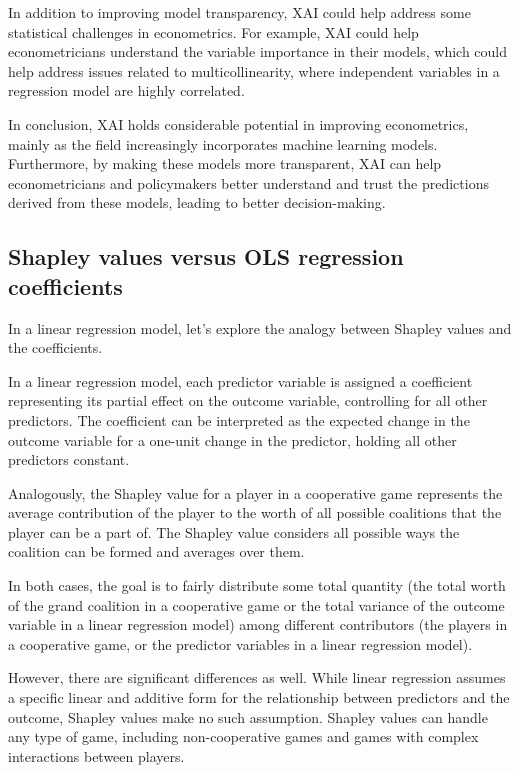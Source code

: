 \documentclass[
  letterpaper,
  DIV=11,
  numbers=noendperiod]{scrartcl}
\begin{document}
In addition to improving model transparency, XAI could help address some
statistical challenges in econometrics. For example, XAI could help
econometricians understand the variable importance in their models,
which could help address issues related to multicollinearity, where
independent variables in a regression model are highly correlated.

In conclusion, XAI holds considerable potential in improving
econometrics, mainly as the field increasingly incorporates machine
learning models. Furthermore, by making these models more transparent,
XAI can help econometricians and policymakers better understand and
trust the predictions derived from these models, leading to better
decision-making.

\hypertarget{shapley-values-versus-ols-regression-coefficients}{%
\subsection{Shapley values versus OLS regression
coefficients}\label{shapley-values-versus-ols-regression-coefficients}}

In a linear regression model, let's explore the analogy between Shapley
values and the coefficients.

In a linear regression model, each predictor variable is assigned a
coefficient representing its partial effect on the outcome variable,
controlling for all other predictors. The coefficient can be interpreted
as the expected change in the outcome variable for a one-unit change in
the predictor, holding all other predictors constant.

Analogously, the Shapley value for a player in a cooperative game
represents the average contribution of the player to the worth of all
possible coalitions that the player can be a part of. The Shapley value
considers all possible ways the coalition can be formed and averages
over them.

In both cases, the goal is to fairly distribute some total quantity (the
total worth of the grand coalition in a cooperative game or the total
variance of the outcome variable in a linear regression model) among
different contributors (the players in a cooperative game, or the
predictor variables in a linear regression model).

However, there are significant differences as well. While linear
regression assumes a specific linear and additive form for the
relationship between predictors and the outcome, Shapley values make no
such assumption. Shapley values can handle any type of game, including
non-cooperative games and games with complex interactions between
players.
\end{document}
